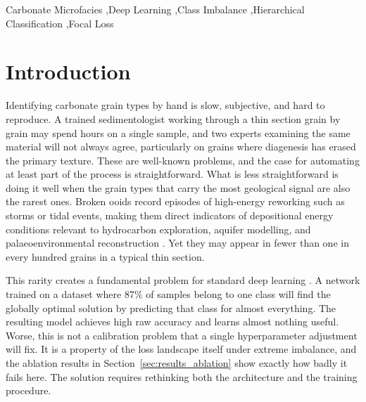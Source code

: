 \documentclass[a4paper,fleqn]{cas-dc}
\begin{document}
\begin{keywords}
Carbonate Microfacies \sep Deep Learning \sep Class Imbalance \sep Hierarchical Classification \sep Focal Loss
\end{keywords}

\maketitle

\section{Introduction}

Identifying carbonate grain types by hand is slow, subjective, and hard to reproduce. A trained sedimentologist working through a thin section grain by grain may spend hours on a single sample, and two experts examining the same material will not always agree, particularly on grains where diagenesis has erased the primary texture. These are well-known problems, and the case for automating at least part of the process is straightforward. What is less straightforward is doing it well when the grain types that carry the most geological signal are also the rarest ones. Broken ooids record episodes of high-energy reworking such as storms or tidal events, making them direct indicators of depositional energy conditions relevant to hydrocarbon exploration, aquifer modelling, and palaeoenvironmental reconstruction \citep{flugel2010}. Yet they may appear in fewer than one in every hundred grains in a typical thin section.

This rarity creates a fundamental problem for standard deep learning \citep{johnson2019imbalance}. A network trained on a dataset where 87\% of samples belong to one class will find the globally optimal solution by predicting that class for almost everything. The resulting model achieves high raw accuracy and learns almost nothing useful. Worse, this is not a calibration problem that a single hyperparameter adjustment will fix. It is a property of the loss landscape itself under extreme imbalance, and the ablation results in Section~\ref{sec:results_ablation} show exactly how badly it fails here. The solution requires rethinking both the architecture and the training procedure.
\end{document}
